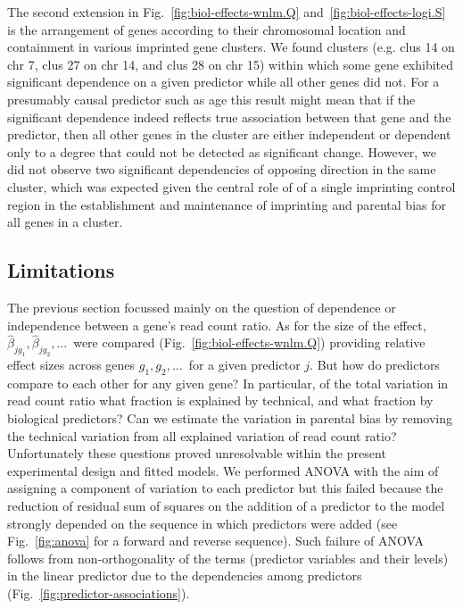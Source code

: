 \documentclass[letterpaper]{article}
\begin{document}
The second extension in Fig.~\ref{fig:biol-effects-wnlm.Q}
and~\ref{fig:biol-effects-logi.S} is the arrangement of genes according to
their chromosomal location and containment in various imprinted gene clusters.
We found clusters (e.g. clus 14 on chr 7, clus 27 on chr 14, and clus 28 on
chr 15) within which some gene exhibited significant dependence on a given
predictor while all other genes did not. For a presumably causal predictor such
as age this result might mean that if the significant dependence indeed
reflects true association between that gene and the predictor, then all other
genes in the cluster are either independent or dependent only to a degree that
could not be detected as significant change. However, we did not observe two
significant dependencies of opposing direction in the same cluster, which was
expected given the central role of of a single imprinting control region in
the establishment and maintenance of imprinting and parental bias for all
genes in a cluster.

\subsection{Limitations}
\label{sec:limitations}

The previous section focussed mainly on the question of dependence or independence between a gene's read
count ratio. As for the size of the effect, \(\hat\beta_{jg_1},
\hat\beta_{jg_2},...\)~were compared (Fig.~\ref{fig:biol-effects-wnlm.Q}) providing relative
effect sizes across genes \(g_1, g_2,...\)~for a given predictor \(j\). But how do predictors compare to each
other for any given gene? In particular, of the total variation in read count ratio what fraction is
explained by technical, and what fraction by biological predictors? Can we estimate the variation in
parental bias by removing the technical variation from all explained variation of read count ratio?
Unfortunately these questions proved unresolvable within the present experimental design and
fitted models. We performed ANOVA with the aim of assigning a component of variation to
each predictor but this failed because the reduction of residual sum of squares on the addition of
a predictor to the model strongly depended on the sequence in which predictors were added (see
Fig.~\ref{fig:anova} for a forward and reverse sequence). Such failure of ANOVA follows from non-orthogonality
of the terms (predictor variables and their levels) in the linear predictor
due to the dependencies among predictors (Fig.~\ref{fig:predictor-associations}).
\end{document}
